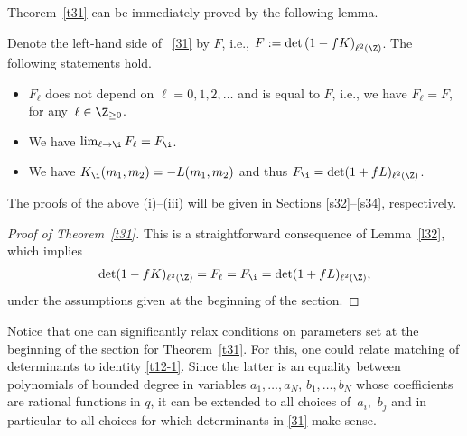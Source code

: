 Theorem~\ref{t31} can be immediately proved by the following lemma.

\begin{Lemma}\label{l32}
Denote the left-hand side of ~\eqref{31} by $F$, i.e., $F:=\det\left(1-f K\right)_{\ell^2(\Z)}$. The following statements hold.
\begin{itemize}\itemsep=0pt
\item[{\rm (i)}]
$F_\ell$ does not depend on $\ell=0,1,2,\dots$ and is equal to $F$, i.e., we have $F_{\ell}=F$, for any~${\ell\in\Z_{\ge 0}}$.
\item[{\rm (ii)}] We have $\lim_{\ell \rightarrow\i} F_{\ell}=F_{\i}$.
\item[{\rm (iii)}] We have $K_{\i}(m_1,m_2)=-L(m_1,m_2)$
and thus $F_{\i}=\det(1+f L)_{\ell^2(\Z)}$.
\end{itemize}
\end{Lemma}
The proofs of the above (i)--(iii) will
be given in Sections \ref{s32}--\ref{s34}, respectively.

\begin{proof}[Proof of Theorem~\ref{t31}]
 This is a straightforward consequence of Lemma~\ref{l32}, which implies
 \begin{align*}
 \det(1-fK)_{\ell^2(\Z)}
 =
 F_{\ell}
 =
 F_{\i}
 =
 \det(1+fL)_{\ell^2(\Z)},
 \end{align*}
 under the assumptions given at the beginning of the section.
 \end{proof}

 Notice that one can significantly relax conditions on parameters set at the beginning of the section for Theorem~\ref{t31}. For this, one could relate matching of determinants to identity \eqref{t12-1}. Since the latter is an equality between polynomials of bounded degree in variables $a_1,\dots,a_N$, $b_1,\dots,b_N$ whose coefficients are rational functions in $q$, it can be extended to all choices of~$a_i$,~$b_j$ and in particular to all choices for which determinants in \eqref{31} make sense.


